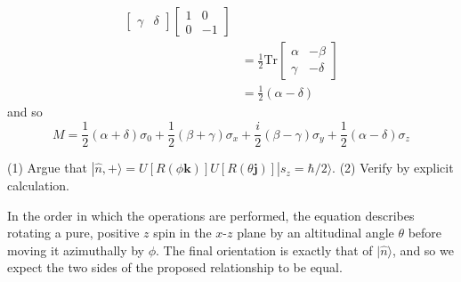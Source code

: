 \documentclass[../principles-of-quantum-mechanics.tex]{subfiles}
\begin{document}
\begin{questions}
\begin{solution}
\begin{align*}
\begin{bmatrix}
					\gamma & \delta
				\end{bmatrix}\begin{bmatrix}1 & 0 \\ 0 & -1\end{bmatrix} \\
				&= \frac{1}{2}\mathrm{Tr}\begin{bmatrix}\alpha & -\beta \\ \gamma & -\delta\end{bmatrix} \\
				&= \frac{1}{2}(\alpha - \delta)
			\end{align*}
			and so
			$$M = \frac{1}{2}(\alpha + \delta)\sigma_0 + \frac{1}{2}(\beta + \gamma)\sigma_x + \frac{i}{2}(\beta - \gamma)\sigma_y + \frac{1}{2}(\alpha - \delta)\sigma_z$$
		\end{solution}
		
		\question (1) Argue that $|\hat{n}, +\rangle = U[R(\phi\mathbf{k})]U[R(\theta\mathbf{j})]|s_z = \hbar/2\rangle$. (2) Verify by explicit calculation.
		
		\begin{solution}
			In the order in which the operations are performed, the equation describes rotating a pure, positive $z$ spin in the $x$-$z$ plane by an altitudinal angle $\theta$ before moving it azimuthally by $\phi$. The final orientation is exactly that of $|\hat{n}\rangle$, and so we expect the two sides of the proposed relationship to be equal.
			

\end{solution}
\end{questions}
\end{document}
